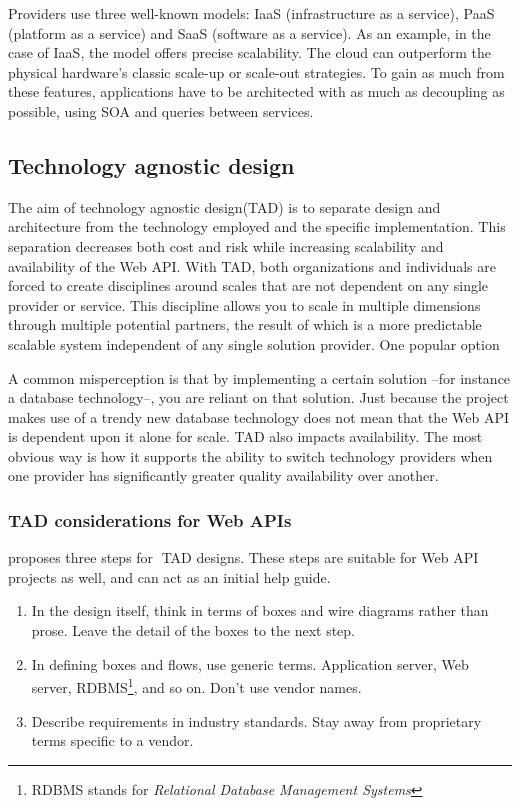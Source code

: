 \documentclass[10pt,article]{IEEEtran}
\begin{document}
Providers use three well-known models: IaaS (infrastructure as a service), PaaS (platform as a service) and SaaS (software as a service). As an example, in the case of IaaS, the model offers precise scalability. The cloud can outperform the physical hardware's classic scale-up or scale-out strategies. To gain as much from these features, applications have to be architected with as much as decoupling as possible, using SOA and queries between services.

\subsection{Technology agnostic design}
The aim of technology agnostic design(TAD) is to separate design and architecture from the technology employed and the specific implementation. This separation decreases both cost and risk while increasing scalability and availability of the Web API.
With TAD, both organizations and individuals are forced to create disciplines around scales that are not dependent on any single provider or service. This discipline allows you to scale in multiple dimensions through multiple potential partners, the result of which is a more predictable scalable system independent of any single solution provider. One popular option 

A common misperception is that by implementing a certain solution --for instance a database technology--, you are reliant on that solution. Just because the project makes use of a trendy new database technology does not mean that the Web API is dependent upon it alone for scale. TAD also impacts availability. The most obvious way is how it supports the ability to switch technology providers when one provider has significantly greater quality availability over another.

\subsubsection{TAD considerations for Web APIs} \cite{artofscalability} proposes three steps for TAD designs. These steps are suitable for Web API projects as well, and can act as an initial help guide.

\begin{enumerate}
    \item
    In the design itself, think in terms of boxes and wire diagrams rather than prose. Leave the detail of the boxes to the next step.
    \item
    In defining boxes and flows, use generic terms. Application server, Web server, RDBMS\footnote{RDBMS stands for \textit{Relational Database Management Systems}}, and so on. Don't use vendor names.
    \item
    Describe requirements in industry standards. Stay away from proprietary terms specific to a vendor.  
\end{enumerate}
\end{document}
